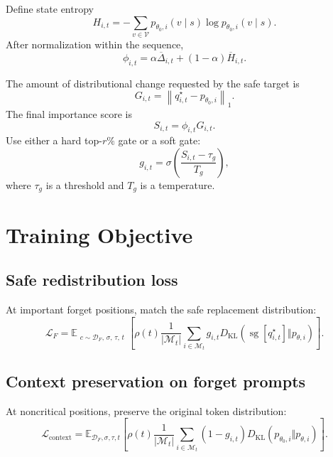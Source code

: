 \documentclass[10pt]{article}
\newcommand{\E}{\mathbb{E}}
\newcommand{\KL}{D_{\mathrm{KL}}}
\newcommand{\V}{\mathcal{V}}
\newcommand{\DF}{\mathcal{D}_{F}}
\newcommand{\M}{\mathcal{M}}
\newcommand{\sg}{\operatorname{sg}}
\newcommand{\1}{\mathbb{I}}
\begin{document}
Define state entropy
\begin{equation}
H_{i,t}
=-\sum_{v\in\V}p_{\theta_0,i}(v\mid s)
\log p_{\theta_0,i}(v\mid s).
\end{equation}
After normalization within the sequence,
\begin{equation}
\phi_{i,t}
=\alpha\overline\Delta_{i,t}+(1-\alpha)\overline H_{i,t}.
\end{equation}

The amount of distributional change requested by the safe target is
\begin{equation}
G_{i,t}
=
\left\|q_{i,t}^\star-p_{\theta_0,i}\right\|_1.
\label{eq:redistribution}
\end{equation}
The final importance score is
\begin{equation}
S_{i,t}=\phi_{i,t}G_{i,t}.
\end{equation}
Use either a hard top-$r\%$ gate or a soft gate:
\begin{equation}
g_{i,t}=\sigma\!\left(\frac{S_{i,t}-\tau_g}{T_g}\right),
\label{eq:gate}
\end{equation}
where $\tau_g$ is a threshold and $T_g$ is a temperature.

\section{Training Objective}

\subsection{Safe redistribution loss}

At important forget positions, match the safe replacement distribution:
\begin{equation}
\mathcal L_F
=
\E_{\substack{c\sim\DF,\,\sigma,\,\tau,\,t}}
\left[
\rho(t)
\frac{1}{|\M_t|}
\sum_{i\in\M_t}
 g_{i,t}
\KL\!\left(
\sg[q_{i,t}^\star]\Vert p_{\theta,i}
\right)
\right].
\label{eq:forget_loss}
\end{equation}

\subsection{Context preservation on forget prompts}

At noncritical positions, preserve the original token distribution:
\begin{equation}
\mathcal L_{\mathrm{context}}
=
\E_{\DF,\sigma,\tau,t}
\left[
\rho(t)
\frac{1}{|\M_t|}
\sum_{i\in\M_t}
(1-g_{i,t})
\KL\!\left(
 p_{\theta_0,i}\Vert p_{\theta,i}
\right)
\right].
\label{eq:context_loss}
\end{equation}
\end{document}
